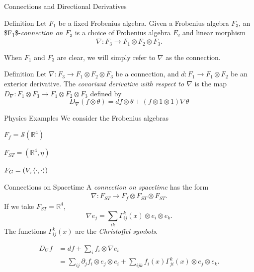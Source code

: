 \documentclass[presentation]{beamer}
\begin{document}
\begin{frame}[label={sec:orgcd80953}]{Connections and Directional Derivatives}
\begin{block}{Definition}
Let \(F_{1}\) be a fixed Frobenius algebra. 
Given a Frobenius algebra \(F_3\), an \$F\textsubscript{1}\$-\emph{connection on \(F_3\)} is a choice of Frobenius algebra \(F_{2}\) and linear morphism 
\[
\nabla: F_{3} \to F_1 \otimes F_2 \otimes F_3.
\]

\bigskip

When \(F_1\) and \(F_3\) are clear, we will simply refer to \(\nabla\) as the connection.
\end{block}
\begin{block}{Definition}
Let \(\nabla: F_3 \to F_1 \otimes F_2 \otimes F_3\) be a connection, and \(d: F_1 \to F_1 \otimes F_2\) be an exterior derivative. The \emph{covariant derivative with respect to \(\nabla\)} is the map \(D_\nabla: F_1 \otimes F_3 \to F_1 \otimes F_2 \otimes F_3\) defined by
\[
D_{\nabla} (f \otimes\theta)= df \otimes \theta + (f \otimes 1 \otimes 1) \nabla\theta
\]
\end{block}
\end{frame}
\begin{frame}[label={sec:orgcb3c154},fragile]{Physics Examples}
 We consider the Frobenius algebras 

\bigskip

 \(F_f = \mathcal{S}(\mathbb{R}^4)\)

\bigskip

 \(F_{ST} = (\mathbb{R}^{4}, \eta)\)

\bigskip

 \(F_G = (V, \left\langle \cdot, \cdot \right\rangle)\)
\end{frame}
\begin{frame}[label={sec:org0f68090},fragile]{Connections on Spacetime}
 A \emph{connection on spacetime} has the form
\begin{align*}
\nabla: F_{ST} \to F_f \otimes F_{ST} \otimes F_{ST}.
\end{align*}
If we take \(F_{ST} = \mathbb{R}^4\),
\[
\nabla e_j = \sum_{ik} \Gamma_{ij}^k(x) \otimes e_i \otimes e_k.
\]
The functions \(\Gamma_{ij}^k(x)\) are the \emph{Christoffel symbols}.


\begin{align*}
D_\nabla f &= df + \sum_i f_i \otimes \nabla e_i \\
&= \sum_{ij} \partial_j f_i \otimes e_j \otimes e_i + \sum_{ijk} f_i(x) \Gamma_{ji}^k (x) \otimes e_j \otimes e_k.
\end{align*}
\end{frame}
\end{document}
